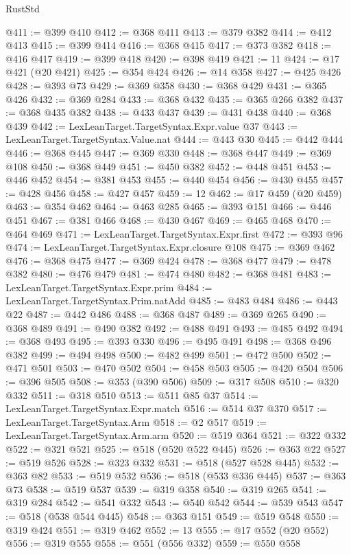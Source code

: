 \begin{lexlean}{RustStd}
\begin{coremodule}
{\begin{coremodule}
{{{{{{{{{{{{{{{{{{{{{{{{{{{{{{{{{{{{{{{{{{{{{{{{{{@411 := @399 @410
@412 := @368 @411
@413 := @379 @382
@414 := @412 @413
@415 := @399 @414
@416 := @368 @415
@417 := @373 @382
@418 := @416 @417
@419 := @399 @418
@420 := @398 @419
@421 := 11
@424 := @17 @421 (@20 @421)
@425 := @354 @424
@426 := @14 @358
@427 := @425 @426
@428 := @393 @73
@429 := @369 @358
@430 := @368 @429
@431 := @365 @426
@432 := @369 @284
@433 := @368 @432
@435 := @365 @266 @382
@437 := @368 @435 @382
@438 := @433 @437
@439 := @431 @438
@440 := @368 @439
@442 := LexLeanTarget.TargetSyntax.Expr.value @37
@443 := LexLeanTarget.TargetSyntax.Value.nat
@444 := @443 @30
@445 := @442 @444
@446 := @368 @445
@447 := @369 @330
@448 := @368 @447
@449 := @369 @108
@450 := @368 @449
@451 := @450 @382
@452 := @448 @451
@453 := @446 @452
@454 := @381 @453
@455 := @440 @454
@456 := @430 @455
@457 := @428 @456
@458 := @427 @457
@459 := 12
@462 := @17 @459 (@20 @459)
@463 := @354 @462
@464 := @463 @285
@465 := @393 @151
@466 := @446 @451
@467 := @381 @466
@468 := @430 @467
@469 := @465 @468
@470 := @464 @469
@471 := LexLeanTarget.TargetSyntax.Expr.first
@472 := @393 @96
@474 := LexLeanTarget.TargetSyntax.Expr.closure @108
@475 := @369 @462
@476 := @368 @475
@477 := @369 @424
@478 := @368 @477
@479 := @478 @382
@480 := @476 @479
@481 := @474 @480
@482 := @368 @481
@483 := LexLeanTarget.TargetSyntax.Expr.prim
@484 := LexLeanTarget.TargetSyntax.Prim.natAdd
@485 := @483 @484
@486 := @443 @22
@487 := @442 @486
@488 := @368 @487
@489 := @369 @265
@490 := @368 @489
@491 := @490 @382
@492 := @488 @491
@493 := @485 @492
@494 := @368 @493
@495 := @393 @330
@496 := @495 @491
@498 := @368 @496 @382
@499 := @494 @498
@500 := @482 @499
@501 := @472 @500
@502 := @471 @501
@503 := @470 @502
@504 := @458 @503
@505 := @420 @504
@506 := @396 @505
@508 := @353 (@390 @506)
@509 := @317 @508
@510 := @320 @332
@511 := @318 @510
@513 := @511 @85 @37
@514 := LexLeanTarget.TargetSyntax.Expr.match
@516 := @514 @37 @370
@517 := LexLeanTarget.TargetSyntax.Arm
@518 := @2 @517
@519 := LexLeanTarget.TargetSyntax.Arm.arm
@520 := @519 @364
@521 := @322 @332
@522 := @321 @521
@525 := @518 (@520 @522 @445)
@526 := @363 @22
@527 := @519 @526
@528 := @323 @332
@531 := @518 (@527 @528 @445)
@532 := @363 @82
@533 := @519 @532
@536 := @518 (@533 @336 @445)
@537 := @363 @73
@538 := @519 @537
@539 := @319 @358
@540 := @319 @265
@541 := @319 @284
@542 := @541 @332
@543 := @540 @542
@544 := @539 @543
@547 := @518 (@538 @544 @445)
@548 := @363 @151
@549 := @519 @548
@550 := @319 @424
@551 := @319 @462
@552 := 13
@555 := @17 @552 (@20 @552)
@556 := @319 @555
@558 := @551 (@556 @332)
@559 := @550 @558
}}}}}}}}}}}}}}}}}}}}}}}}}}}}}}}}}}}}}}}}}}}}}}}}}}
\end{coremodule}}
\end{coremodule}
\end{lexlean}

